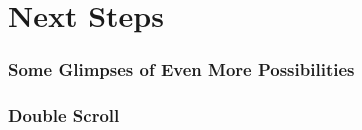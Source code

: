 \documentclass{beamer}
\begin{document}
    \section{Next Steps}\label{sct:allRes}
        \begin{frame}
            \frametitle{Some Glimpses of Even More Possibilities}
        \end{frame}
        \begin{frame}
            \frametitle{Double Scroll}
        \end{frame}
\end{document}
